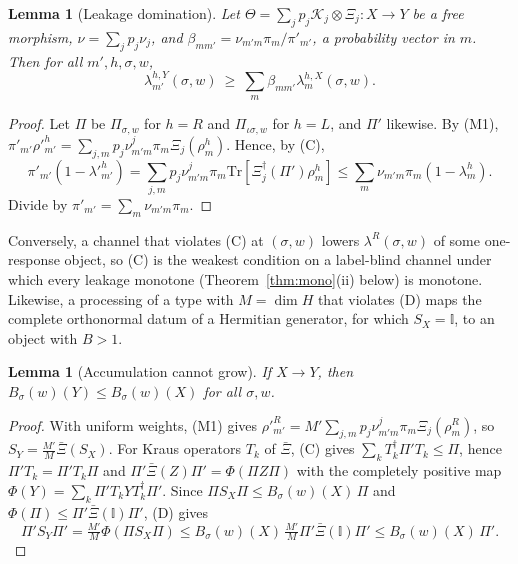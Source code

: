 \documentclass[11pt]{article}
\newtheorem{lemma}[theorem]{Lemma}
\theoremstyle{definition}
\theoremstyle{remark}
\newcommand{\Tr}{\mathrm{Tr}}
\newcommand{\one}{\mathbb{I}}
\newcommand{\isig}{\iota\sigma}
\begin{document}
\begin{lemma}[Leakage domination]\label{lem:dom}
Let $\Theta=\sum_jp_j\mathcal K_j\otimes\Xi_j:X\to Y$ be a free morphism, $\nu=\sum_jp_j\nu_j$, and $\beta_{mm'}=\nu_{m'm}\pi_m/\pi'_{m'}$, a probability vector in $m$. Then for all $m',h,\sigma,w$,
\[
\lambda^{h,Y}_{m'}(\sigma,w)\ \ge\ \sum_m\beta_{mm'}\lambda^{h,X}_m(\sigma,w).
\]
\end{lemma}
\begin{proof}
Let $\Pi$ be $\Pi_{\sigma,w}$ for $h=R$ and $\Pi_{\isig,w}$ for $h=L$, and $\Pi'$ likewise. By (M1), $\pi'_{m'}\rho'^h_{m'}=\sum_{j,m}p_j\nu^{j}_{m'm}\pi_m\Xi_j(\rho^h_m)$. Hence, by (C),
\[
\pi'_{m'}(1-\lambda'^h_{m'})=\textstyle\sum_{j,m}p_j\nu^j_{m'm}\pi_m\Tr[\Xi_j^\dagger(\Pi')\rho^h_m]\le\sum_m\nu_{m'm}\pi_m(1-\lambda^h_m).
\]
Divide by $\pi'_{m'}=\sum_m\nu_{m'm}\pi_m$.
\end{proof}

Conversely, a channel that violates (C) at $(\sigma,w)$ lowers $\lambda^R(\sigma,w)$ of some one-response object, so (C) is the weakest condition on a label-blind channel under which every leakage monotone (Theorem~\ref{thm:mono}(ii) below) is monotone. Likewise, a processing of a type with $M=\dim H$ that violates (D) maps the complete orthonormal datum of a Hermitian generator, for which $S_X=\one$, to an object with $B>1$.

\begin{lemma}[Accumulation cannot grow]\label{lem:accmono}
If $X\to Y$, then $B_\sigma(w)(Y)\le B_\sigma(w)(X)$ for all $\sigma,w$.
\end{lemma}
\begin{proof}
With uniform weights, (M1) gives $\rho'^R_{m'}=M'\sum_{j,m}p_j\nu^j_{m'm}\pi_m\Xi_j(\rho^R_m)$, so $S_Y=\frac{M'}{M}\bar\Xi(S_X)$. For Kraus operators $T_k$ of $\bar\Xi$, (C) gives $\sum_kT_k^\dagger\Pi'T_k\le\Pi$, hence $\Pi'T_k=\Pi'T_k\Pi$ and $\Pi'\bar\Xi(Z)\Pi'=\Phi(\Pi Z\Pi)$ with the completely positive map $\Phi(Y)=\sum_k\Pi'T_kYT_k^\dagger\Pi'$. Since $\Pi S_X\Pi\le B_\sigma(w)(X)\,\Pi$ and $\Phi(\Pi)\le\Pi'\bar\Xi(\one)\Pi'$, (D) gives
\[
\Pi'S_Y\Pi'=\tfrac{M'}{M}\Phi(\Pi S_X\Pi)\le B_\sigma(w)(X)\,\tfrac{M'}{M}\Pi'\bar\Xi(\one)\Pi'\le B_\sigma(w)(X)\,\Pi' .
\]
\end{proof}
\end{document}
